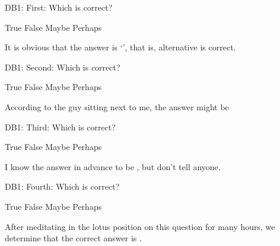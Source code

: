 %
%

\begin{rtVW}
\begin{problem}[5]
DB1: First: Which is correct?
\begin{answers}{4}
\bChoices[nCols=1,random,label=db1-1]
     True\eAns
     False\eAns
     Maybe\eAns
     Perhaps\eAns
\eChoices
\end{answers}
\begin{solution}
It is obvious that the answer is `', that is, alternative  is correct.
\end{solution}
\end{problem}
\end{rtVW}

\begin{rtVW}
\begin{problem}[5]
DB1: Second: Which is correct?
\begin{answers}{4}
\bChoices[nCols=1,random,label=db1-2]
     True\eAns
     False\eAns
     Maybe\eAns
     Perhaps\eAns
\eChoices
\end{answers}
\begin{solution}
According to the guy sitting next to me, the answer might be 
\end{solution}
\end{problem}
\end{rtVW}

\begin{rtVW}
\begin{problem}[5]
DB1: Third: Which is correct?
\begin{answers}{4}
\bChoices[nCols=1,random,label=db1-3]
     True\eAns
     False\eAns
     Maybe\eAns
     Perhaps\eAns
\eChoices
\end{answers}
\begin{solution}
I know the answer in advance to be , but don't tell anyone.
\end{solution}
\end{problem}
\end{rtVW}

\begin{rtVW}
\begin{problem}[5]
DB1: Fourth: Which is correct?
\begin{answers}{4}
\bChoices[nCols=1,random,label=db1-4]
     True\eAns
     False\eAns
     Maybe\eAns
     Perhaps\eAns
\eChoices
\end{answers}
\begin{solution}
After meditating in the lotus position on this question for many hours, we determine that the correct answer is \textbf{}.
\end{solution}
\end{problem}
\end{rtVW}

\eRTVToks

\endinput
